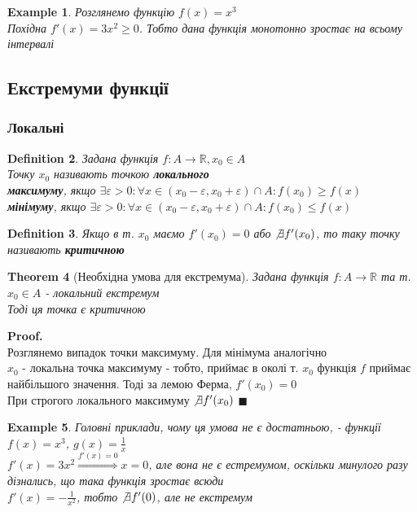 \documentclass[a4paper, 14pt]{extarticle}
\def\huge{\displaystyle}
\theoremstyle{theoremdd}
\newtheorem{theorem}{Theorem}[subsection]
\theoremstyle{theoremdd}
\newtheorem{definition}[theorem]{Definition}
\theoremstyle{theoremdd}
\theoremstyle{theoremdd}
\newtheorem{example}[theorem]{Example}
\theoremstyle{theoremdd}
\theoremstyle{theoremdd}
\theoremstyle{theoremdd}
\theoremstyle{theoremdd}
\newenvironment{pf}{\vspace*{-3mm} \textbf{Proof. \\}}{$\blacksquare$}
\begin{document}
\begin{example}
Розглянемо функцію $f(x) = x^3$\\
Похідна $f'(x) = 3x^2 \geq 0$. Тобто дана функція монотонно зростає на всьому інтервалі
\end{example}

\subsection{Екстремуми функції}
\subsubsection{Локальні}
\begin{definition}
Задана функція $f: A \to \mathbb{R}, x_0 \in A$\\
Точку $x_0$ називають точкою \textbf{локального}\\
\textbf{максимуму}, якщо $\exists \varepsilon > 0: \forall x \in (x_0-\varepsilon, x_0 +\varepsilon) \cap A: f(x_0) \geq f(x)$\\
\textbf{мінімуму}, якщо $\exists \varepsilon > 0: \forall x \in (x_0-\varepsilon, x_0 +\varepsilon) \cap A: f(x_0) \leq f(x)$
\end{definition}

\begin{definition}
Якщо в т. $x_0$ маємо $f'(x_0) = 0$ або $\not\exists f'(x_0)$, то таку точку називають \textbf{критичною}
\end{definition}

\begin{theorem}[Необхідна умова для екстремума]
Задана функція $f: A \to \mathbb{R}$ та т. $x_0 \in A$ - локальний екстремум\\
Тоді ця точка є критичною\\
\end{theorem}

\begin{pf}
Розглянемо випадок точки максимуму. Для мінімума аналогічно\\
$x_0$ - локальна точка максимуму - тобто, приймає в околі т. $x_0$ функція $f$ приймає найбільшого значення. Тоді за лемою Ферма, $f'(x_0) = 0$\\
При строгого локального максимуму $\not\exists f'(x_0)$
\end{pf}

\begin{example}
Головні приклади, чому ця умова не є достатньою, - функції $f(x) = x^3$, $g(x) = \huge \frac{1}{x}$\\
$f'(x) = 3x^2 \overset{f'(x) = 0}{\Rightarrow} x = 0$, але вона не є естремумом, оскільки минулого разу дізнались, що така функція зростає всюди\\
$f'(x) = \huge -\frac{1}{x^2}$, тобто $\not\exists f'(0)$, але не екстремум
\end{example}
\end{document}
